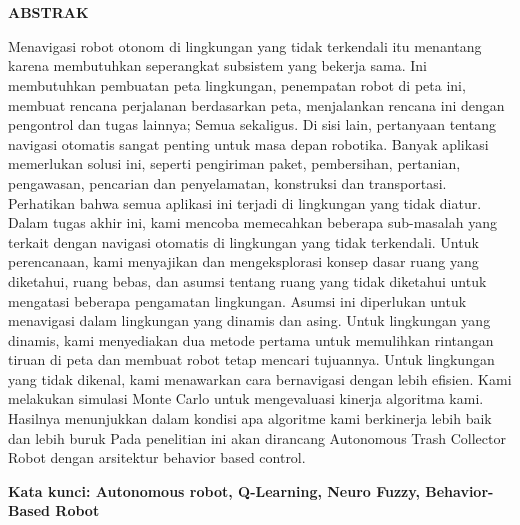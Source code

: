 \chapter*{}
\vspace*{-1.0cm}
\begin{center}
\normalfont\LARGE\textbf{ABSTRAK}
\end{center}

Menavigasi robot otonom  di lingkungan yang tidak terkendali itu menantang 
karena membutuhkan seperangkat subsistem yang bekerja sama. 
Ini membutuhkan pembuatan peta lingkungan, penempatan robot di peta ini, 
membuat rencana perjalanan berdasarkan peta, menjalankan rencana ini dengan pengontrol dan tugas lainnya; 
Semua sekaligus. Di sisi lain, pertanyaan tentang navigasi otomatis sangat penting untuk masa depan robotika. 
Banyak aplikasi  memerlukan solusi ini, seperti pengiriman paket, pembersihan, pertanian, pengawasan, 
pencarian dan penyelamatan, konstruksi dan transportasi. Perhatikan bahwa semua aplikasi ini terjadi di lingkungan yang tidak diatur. 
Dalam tugas akhir ini, kami mencoba memecahkan beberapa sub-masalah yang terkait dengan navigasi otomatis di lingkungan yang tidak terkendali. 
Untuk perencanaan, kami menyajikan dan mengeksplorasi konsep dasar ruang yang diketahui, ruang bebas, 
dan asumsi tentang ruang yang tidak diketahui untuk mengatasi beberapa pengamatan lingkungan. 
Asumsi ini diperlukan untuk menavigasi dalam lingkungan yang dinamis dan asing. Untuk lingkungan yang dinamis, 
kami menyediakan dua metode pertama untuk memulihkan rintangan tiruan di peta dan membuat robot tetap mencari tujuannya. 
Untuk lingkungan yang tidak dikenal, kami menawarkan cara bernavigasi dengan lebih efisien. 
Kami melakukan simulasi Monte Carlo untuk mengevaluasi kinerja algoritma kami. 
Hasilnya menunjukkan dalam kondisi apa algoritme kami berkinerja lebih baik dan lebih buruk
Pada penelitian ini akan dirancang Autonomous Trash Collector Robot dengan arsitektur behavior based control. 

\textbf{Kata kunci: Autonomous robot, Q-Learning, Neuro Fuzzy, Behavior-Based Robot} 




